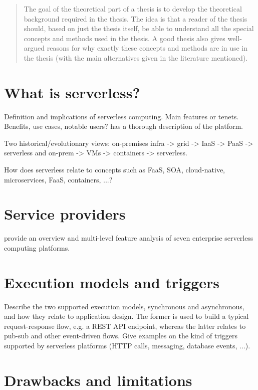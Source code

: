 \documentclass[utf8,english]{gradu3}
\begin{document}
\begin{quote}
The goal of the theoretical part of a thesis is to develop the theoretical background required in the thesis.  The idea is that a reader of the thesis should, based on just the thesis itself, be able to understand all the special concepts and methods used in the thesis. A good thesis also gives well-argued reasons for why exactly these concepts and methods are in use in the thesis (with the main alternatives given in the literature mentioned).
\end{quote}

\section{What is serverless?}

Definition and implications of serverless computing. Main features or tenets. Benefits, use cases, notable users? \textcite{robert2016serverlessarchitectures} has a thorough description of the platform.

Two historical/evolutionary views: on-premises infra -> grid -> IaaS -> PaaS -> serverless and on-prem -> VMs -> containers -> serverless.

How does serverless relate to concepts such as FaaS, SOA, cloud-native, microservices, FaaS, containers, ...?

\section{Service providers}

\textcite{lynn2017preliminary} provide an overview and multi-level feature analysis of seven enterprise serverless computing platforms.

\section{Execution models and triggers}

Describe the two supported execution models, synchronous and asynchronous, and how they relate to application design. The former is used to build a typical request-response flow, e.g. a REST API endpoint, whereas the latter relates to pub-sub and other event-driven flows. Give examples on the kind of triggers supported by serverless platforms (HTTP calls, messaging, database events, ...).

\section{Drawbacks and limitations}
\end{document}

